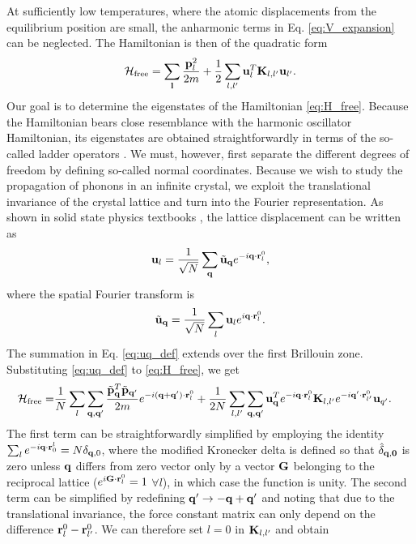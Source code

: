 At sufficiently low temperatures, where the atomic displacements from the equilibrium position are small, the anharmonic terms in Eq. \eqref{eq:V_expansion} can be neglected. The Hamiltonian is then of the quadratic form
\begin{equation}
 \mathcal{H}_{\textrm{free}} = \sum_{\mathbf{l}} \frac{\mathbf{p}_l^2}{2m} + \frac{1}{2} \sum_{l,l'} \mathbf{u}_l^T \mathbf{K}_{l,l'} \mathbf{u}_{l'}. \label{eq:H_free}
\end{equation}
Our goal is to determine the eigenstates of the Hamiltonian \eqref{eq:H_free}. Because the Hamiltonian bears close resemblance with the harmonic oscillator Hamiltonian, its eigenstates are obtained straightforwardly in terms of the so-called ladder operators \cite{schwabl}. We must, however, first separate the different degrees of freedom by defining so-called normal coordinates. Because we wish to study the propagation of phonons in an infinite crystal, we exploit the translational invariance of the crystal lattice and turn into the Fourier representation. As shown in solid state physics textbooks \cite{ashcroftmermin}, the lattice displacement can be written as 
\begin{equation}
 \mathbf{u}_l = \frac{1}{\sqrt{N}}  \sum_{\mathbf{q}} \tilde{\mathbf{u}}_{\mathbf{q}} e^{-i\mathbf{q} \cdot\mathbf{r}_l^0 }, \label{eq:uq_def}
\end{equation}
where the spatial Fourier transform is
\begin{equation}
 \tilde{\mathbf{u}}_{\mathbf{q}} = \frac{1}{\sqrt{N}} \sum_l \mathbf{u}_l e^{i\mathbf{q}\cdot \mathbf{r}_l^0}.
\end{equation}
The summation in Eq. \eqref{eq:uq_def} extends over the first Brillouin zone. Substituting \eqref{eq:uq_def} to \eqref{eq:H_free}, we get
\begin{alignat}{2}
 \mathcal{H}_{\textrm{free}} =& \frac{1}{N} \sum_{l} \sum_{\mathbf{q},\mathbf{q'}} \frac{\tilde{\mathbf{p}}_{\mathbf{q}}^T\tilde{\mathbf{p}}_{\mathbf{q'}}}{2m} e^{-i(\mathbf{q}+\mathbf{q}')\cdot\mathbf{r}^0_l} + \frac{1}{2N} \sum_{l,l'} \sum_{\mathbf{q},\mathbf{q}'} \mathbf{u}_{\mathbf{q}}^T e^{-i\mathbf{q}\cdot\mathbf{r}_l^0}\mathbf{K}_{l,l'}e^{-i\mathbf{q}'\cdot\mathbf{r}_{l'}^0} \mathbf{u}_{q'}. 
\end{alignat}
The first term can be straightforwardly simplified by employing the identity $\sum_{l}e^{-i\mathbf{q}\cdot \mathbf{r}_0^l} = N\delta_{\mathbf{q},0}$, where the modified Kronecker delta is defined so that $\hat \delta_{\mathbf{q},\mathbf{0}}$ is zero unless $\mathbf{q}$ differs from zero vector only by a vector $\mathbf{G}$ belonging to the reciprocal lattice ($e^{i\mathbf{G}\cdot \mathbf{r}_l^0}=1$ $\forall l$), in which case the function is unity. The second term can be simplified by redefining $\mathbf{q}' \to -\mathbf{q}+\mathbf{q}'$ and noting that due to the translational invariance, the force constant matrix can only depend on the difference $\mathbf{r}^0_l - \mathbf{r}^0_{l'}$. We can therefore set $l=0$ in $\mathbf{K}_{l,l'}$ and obtain 
